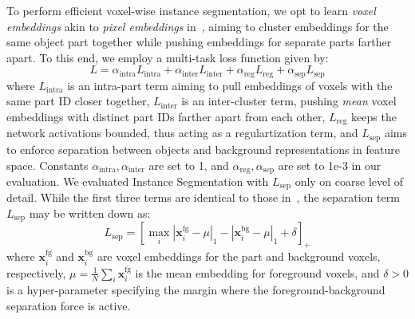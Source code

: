 To perform efficient voxel-wise instance segmentation, we opt to learn \emph{voxel embeddings} akin to \emph{pixel embeddings} in~\cite{de2017semantic}, aiming to cluster embeddings for the same object part together while pushing embeddings for separate parts farther apart.
To this end, we employ a multi-task loss function given by:
\begin{equation}
\label{eq:ours_instance_seg_loss}
L = \alpha_{\text{intra}} L_{\text{intra}}
  + \alpha_{\text{inter}} L_{\text{inter}}
  + \alpha_{\text{reg}} L_{\text{reg}}
  + \alpha_{\text{sep}} L_{\text{sep}}
\end{equation}
where 
$L_{\text{intra}}$ is an intra-part term aiming to pull embeddings of voxels with the same part ID closer together,
$L_{\text{inter}}$ is an inter-cluster term, pushing \emph{mean} voxel embeddings with distinct part IDs farther apart from each other,
$L_{\text{reg}}$ keeps the network activations bounded, thus acting as a regulartization term, and
$L_{\text{sep}}$ aims to enforce separation between objects and background representations in feature space. 
Constants $\alpha_{\text{intra}}, \alpha_{\text{inter}}$ are set to 1, and $\alpha_{\text{reg}}, \alpha_{\text{sep}}$ are set to 1e-3 in our evaluation. We evaluated Instance Segmentation with $L_{\text{sep}}$ only on coarse level of detail.
While the first three terms are identical to those in~\cite{de2017semantic,pham2019jsis3d}, the separation term $L_{\text{sep}}$ may be written down as:
\begin{equation}
\label{eq:ours_instance_seg_loss_sep_term}
L_{\text{sep}} = [\max_i|\mathbf{x}^{\text{fg}}_i - \mu|_1 - |\mathbf{x}^{\text{bg}}_i - \mu|_1 + \delta]_+
\end{equation}
where $\mathbf{x}^{\text{fg}}_i$ and $\mathbf{x}^{\text{bg}}_i$ are voxel embeddings for the part and background voxels, respectively, $\mu = \frac 1 N \sum_i \mathbf{x}^{\text{fg}}_i$ is the mean embedding for foreground voxels, and $\delta > 0$ is a hyper-parameter specifying the margin where the foreground-background separation force is active.








